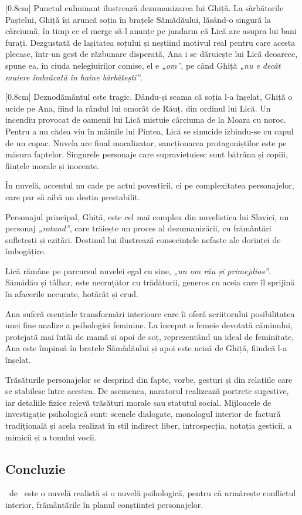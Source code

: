 [0.8cm]
Punctul culminant ilustrează dezumanizarea lui Ghiță. La sărbătorile Paștelui, Ghiță își aruncă soția în brațele Sămădăului, lăsând-o singură la cârciumă, în timp ce el merge să-l anunțe pe jandarm că Lică are asupra lui bani furați. Dezgustată de lașitatea soțului și neștiind motivul real pentru care acesta plecase, într-un gest de răzbunare disperată, Ana i se dăruiește lui Lică deoarece, spune ea, în ciuda nelegiuirilor comise, el e \textit{„om”}, pe când Ghiță \textit{„nu e decât muiere îmbrăcată în haine bărbătești”}.

[0.8cm]
Deznodământul este tragic. Dându-și seama că soția l-a înșelat, Ghiță o ucide pe Ana, fiind la rândul lui omorât de Răuț, din ordinul lui Lică. Un incendiu provocat de oamenii lui Lică mistuie cârciuma de la Moara cu noroc. Pentru a nu cădea viu în mâinile lui Pintea, Lică se sinucide izbindu-se cu capul de un copac. Nuvela are final moralizator, sancționarea protagoniștilor este pe măsura faptelor. Singurele personaje care supraviețuiesc sunt bătrâna și copiii, ființele morale și inocente.

În nuvelă, accentul nu cade pe actul povestirii, ci pe complexitatea personajelor, care par să aibă un destin prestabilit.

Personajul principal, Ghiță, este cel mai complex din nuvelistica lui Slavici, un personaj \textit{„rotund”}, care trăiește un proces al dezumanizării, cu frământări sufletești și ezitări. Destinul lui ilustrează consecințele nefaste ale dorinței de îmbogățire.

Lică rămâne pe parcursul nuvelei egal cu sine, \textit{„un om rău și primejdios”}. Sămădău și tâlhar, este necruțător cu trădătorii, generos cu aceia care îl sprijină în afacerile necurate, hotărât și crud.

Ana suferă esențiale transformări interioare care îi oferă scriitorului posibilitatea unei fine analize a psihologiei feminine. La început o femeie devotată căminului, protejată mai întâi de mamă și apoi de soț, reprezentând un ideal de feminitate, Ana este împinsă în brațele Sămădăului și apoi este ucisă de Ghiță, fiindcă l-a înșelat.

Trăsăturile personajelor se desprind din fapte, vorbe, gesturi și din relațiile care se stabilesc între acestea. De asemenea, naratorul realizează portrete sugestive, iar detaliile fizice relevă trăsături morale sau statutul social. Mijloacele de investigație psihologică sunt: scenele dialogate, monologul interior de factură tradițională și acela realizat în stil indirect liber, introspecția, notația gesticii, a mimicii și a tonului vocii.


\subsection{Concluzie}

\operatitle\ de \operaauthor\ este o nuvelă realistă și o nuvelă psihologică, pentru că urmărește conflictul interior, frământările în planul conștiinței personajelor.
